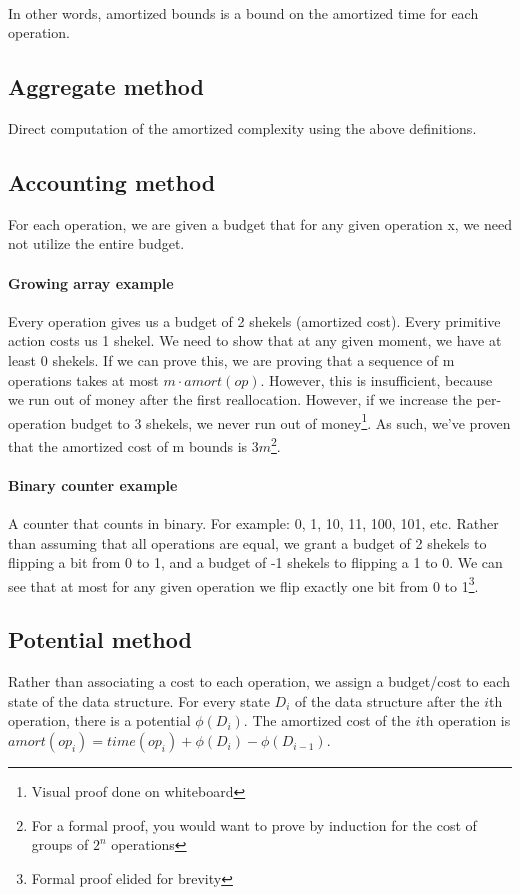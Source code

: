\documentclass[a4paper]{article}
\begin{document}
\paragraph{}
In other words, amortized bounds is a bound on the amortized time for each operation.

\subsection{Aggregate method}
Direct computation of the amortized complexity using the above definitions.

\subsection{Accounting method}
For each operation, we are given a budget that for any given operation x, we need not utilize the entire budget.

\paragraph{Growing array example}
Every operation gives us a budget of 2 shekels (amortized cost). Every primitive action costs us 1 shekel. We need to show that at any given moment, we have at least 0 shekels. If we can prove this, we are proving that a sequence of m operations takes at most $m\cdot amort(op)$. However, this is insufficient, because we run out of money after the first reallocation. However, if we increase the per-operation budget to 3 shekels, we never run out of money\footnote{Visual proof done on whiteboard}. As such, we've proven that the amortized cost of m bounds is $3m$\footnote{For a formal proof, you would want to prove by induction for the cost of groups of $2^n$ operations}.

\paragraph{Binary counter example}
A counter that counts in binary. For example: 0, 1, 10, 11, 100, 101, etc. Rather than assuming that all operations are equal, we grant a budget of 2 shekels to flipping a bit from 0 to 1, and a budget of -1 shekels to flipping a 1 to 0. We can see that at most for any given operation we flip exactly one bit from 0 to 1\footnote{Formal proof elided for brevity}.

\subsection{Potential method}
Rather than associating a cost to each operation, we assign a budget/cost to each state of the data structure. For every state $D_i$ of the data structure after the $i$th operation, there is a potential $\phi(D_i)$. The amortized cost of the $i$th operation is $amort(op_i)=time(op_i)+\phi(D_i)-\phi(D_{i-1})$.
\end{document}
